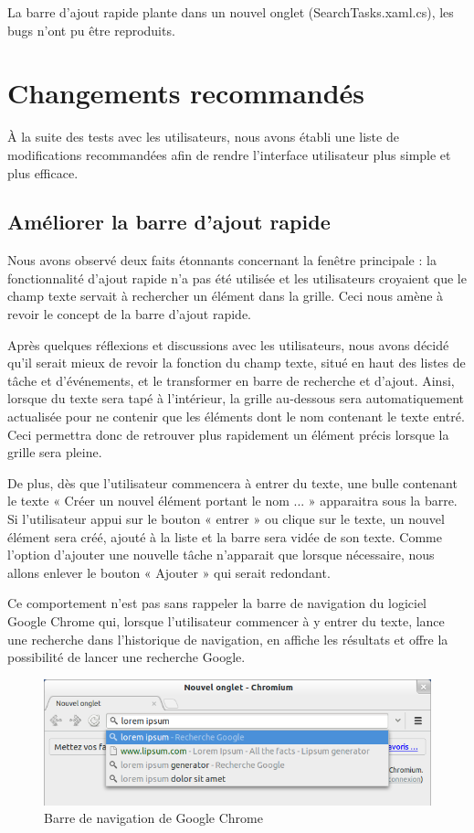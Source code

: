 \documentclass[letterpaper, oneside, 12pt, these, creativecommons]{thETS}
\begin{document}
La barre d'ajout rapide plante dans un nouvel onglet (SearchTasks.xaml.cs), les bugs n'ont pu être reproduits.

\chapter{Changements recommandés}

À la suite des tests avec les utilisateurs, nous avons établi une liste de modifications recommandées afin de rendre l'interface utilisateur plus simple et plus efficace.

\section{Améliorer la barre d'ajout rapide}

Nous avons observé deux faits étonnants concernant la fenêtre principale : la fonctionnalité d'ajout rapide n'a pas été utilisée et les utilisateurs croyaient que le champ texte servait à rechercher un élément dans la grille. Ceci nous amène à revoir le concept de la barre d'ajout rapide.

Après quelques réflexions et discussions avec les utilisateurs, nous avons décidé qu'il serait mieux de revoir la fonction du champ texte, situé en haut des listes de tâche et d'événements, et le transformer en barre de recherche et d'ajout. Ainsi, lorsque du texte sera tapé à l'intérieur, la grille au-dessous sera automatiquement actualisée pour ne contenir que les éléments dont le nom contenant le texte entré. Ceci permettra donc de retrouver plus rapidement un élément précis lorsque la grille sera pleine.

De plus, dès que l'utilisateur commencera à entrer du texte, une bulle contenant le texte « Créer un nouvel élément portant le nom ... » apparaitra sous la barre. Si l'utilisateur appui sur le bouton « entrer » ou clique sur le texte, un nouvel élément sera créé, ajouté à la liste et la barre sera vidée de son texte. Comme l'option d'ajouter une nouvelle tâche n'apparait que lorsque nécessaire, nous allons enlever le bouton « Ajouter » qui serait redondant.

Ce comportement n'est pas sans rappeler la barre de navigation du logiciel Google Chrome qui, lorsque l'utilisateur commencer à y entrer du texte, lance une recherche dans l'historique de navigation, en affiche les résultats et offre la possibilité de lancer une recherche Google.

\begin{figure}
    \includegraphics[scale=0.5]{barre_de_navigation_google_chrome.png}
    \caption{Barre de navigation de Google Chrome}
\end{figure}
\end{document}
